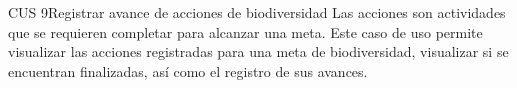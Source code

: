 \begin{UseCase}{CUS 9}{Registrar avance de acciones de biodiversidad}
    {
    Las acciones son actividades que se requieren completar para alcanzar una meta. Este caso de uso permite visualizar las acciones registradas para una meta de biodiversidad, visualizar si se encuentran finalizadas, así como el registro de sus avances. 
    }
    

    


\end{UseCase}
